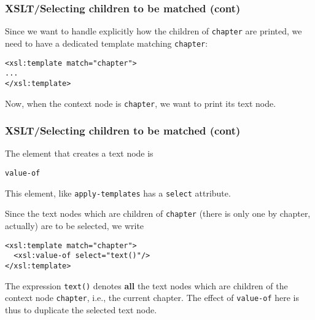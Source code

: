 %
\begin{frame}[containsverbatim]
\frametitle{XSLT/Selecting children to be matched (cont)}

Since we want to handle explicitly how the children of
\texttt{chapter} are printed, we need to have a dedicated template
matching \texttt{chapter}:
{\small
\begin{verbatim}
<xsl:template match="chapter">
...
</xsl:template>
\end{verbatim}
}
Now, when the context node is \texttt{chapter}, we want to print its
text node.

\end{frame}

%
\begin{frame}[containsverbatim]
\frametitle{XSLT/Selecting children to be matched (cont)}

The \XSLT element that creates a text node is
\begin{center}
\verb|value-of|
\end{center}
This element, like \texttt{apply-templates} has a \texttt{select}
attribute.

\bigskip

Since the text nodes which are children of \texttt{chapter} (there is
only one by chapter, actually) are to be selected, we write {\small
\begin{verbatim}
<xsl:template match="chapter">
  <xsl:value-of select="text()"/>
</xsl:template>
\end{verbatim}
}
The expression \texttt{text()} denotes \textbf{all} the text nodes
which are children of the context node \texttt{chapter}, i.e., the
current chapter. The effect of \texttt{value-of} here is thus to
duplicate the selected text node.

\end{frame}

